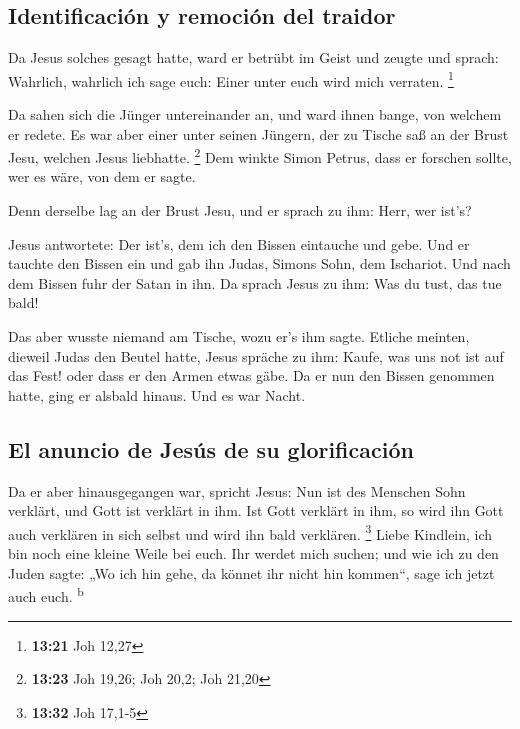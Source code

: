 \hypertarget{identificaciuxf3n-y-remociuxf3n-del-traidor}{%
\subsection{Identificación y remoción del
traidor}\label{identificaciuxf3n-y-remociuxf3n-del-traidor}}

 Da Jesus solches gesagt hatte, ward er betrübt im Geist
und zeugte und sprach: Wahrlich, wahrlich ich sage euch: Einer unter
euch wird mich verraten. \footnote{\textbf{13:21} Joh 12,27}

 Da sahen sich die Jünger untereinander an, und ward
ihnen bange, von welchem er redete.  Es war aber einer
unter seinen Jüngern, der zu Tische saß an der Brust Jesu, welchen Jesus
liebhatte. \footnote{\textbf{13:23} Joh 19,26; Joh 20,2; Joh 21,20}
 Dem winkte Simon Petrus, dass er forschen sollte, wer es
wäre, von dem er sagte.

 Denn derselbe lag an der Brust Jesu, und er sprach zu
ihm: Herr, wer ist's?

 Jesus antwortete: Der ist's, dem ich den Bissen
eintauche und gebe. Und er tauchte den Bissen ein und gab ihn Judas,
Simons Sohn, dem Ischariot.  Und nach dem Bissen fuhr der
Satan in ihn. Da sprach Jesus zu ihm: Was du tust, das tue bald!

 Das aber wusste niemand am Tische, wozu er's ihm sagte.
 Etliche meinten, dieweil Judas den Beutel hatte, Jesus
spräche zu ihm: Kaufe, was uns not ist auf das Fest! oder dass er den
Armen etwas gäbe.  Da er nun den Bissen genommen hatte,
ging er alsbald hinaus. Und es war Nacht.

\hypertarget{el-anuncio-de-jesuxfas-de-su-glorificaciuxf3n}{%
\subsection{El anuncio de Jesús de su
glorificación}\label{el-anuncio-de-jesuxfas-de-su-glorificaciuxf3n}}

 Da er aber hinausgegangen war, spricht Jesus: Nun ist
des Menschen Sohn verklärt, und Gott ist verklärt in ihm.
 Ist Gott verklärt in ihm, so wird ihn Gott auch
verklären in sich selbst und wird ihn bald verklären. \footnote{\textbf{13:32}
  Joh 17,1-5}  Liebe Kindlein, ich bin noch eine kleine
Weile bei euch. Ihr werdet mich suchen; und wie ich zu den Juden sagte:
„Wo ich hin gehe, da könnet ihr nicht hin kommen``, sage ich jetzt auch
euch. \textsuperscript{b}

